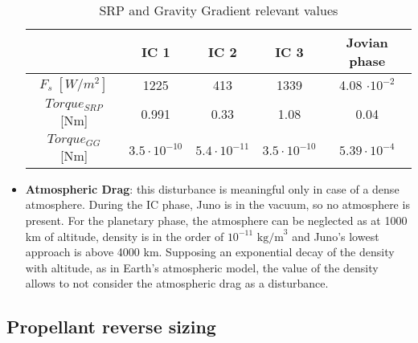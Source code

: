 \begin{itemize}
    \begin{table}[H]
        \renewcommand{\arraystretch}{1.3}
        \centering
        \small
        \begin{tabular}{|c|c|c|c|c|}
            \hline
            &\textbf{IC 1} & \textbf{IC 2} & \textbf{IC 3} & \textbf{Jovian phase} \\
            \hline
            \hline
            $F_{s} \; [W/m^2]$ & 1225 & 413 & 1339 & 4.08 $\cdot 10^{-2}$ \\
            \hline
            $Torque_{SRP}$ [Nm] & 0.991 & 0.33 & 1.08 & 0.04 \\
            \hline
             $Torque_{GG}$ [Nm] & $3.5 \cdot 10^{-10}$ & $5.4 \cdot 10^{-11}$ & $3.5 \cdot 10^{-10}$ & $5.39 \cdot 10^{-4}$ \\
            \hline
        \end{tabular}
        \caption{SRP and Gravity Gradient relevant values}
        \label{table:SRP_GGG}
    \end{table}
    \vspace*{-3mm}
    
    \item \textbf{Atmospheric Drag}: this disturbance is meaningful only in case of a dense atmosphere. During the IC phase, Juno is in the vacuum, so no atmosphere is present. For the planetary phase, the atmosphere can be neglected as at 1000 km of altitude, density is in the order of $10^{-11}$ $\textrm{kg/m}^3$ and Juno's lowest approach is above 4000 km. Supposing an exponential decay of the density with altitude, as in Earth's atmospheric model, the value of the density allows to not consider the atmospheric drag as a disturbance\cite{jupiter_density}.
    
        
\end{itemize}

\subsection{Propellant reverse sizing}
\label{subsec:prop_rev_sizing}

